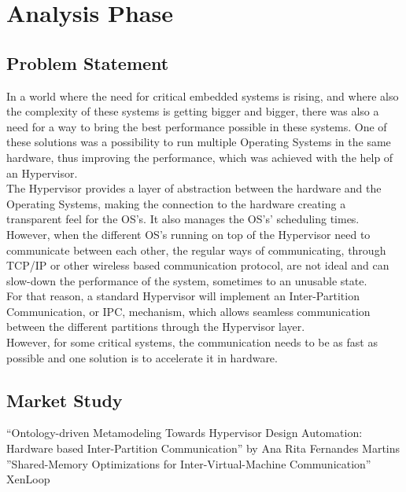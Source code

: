 \newpage
\section{Analysis Phase}

\subsection{Problem Statement}
In a world where the need for critical embedded systems is rising, and where also the complexity of these systems is getting bigger and bigger, there was also a need for a way to bring the best performance possible in these systems. One of these solutions was a possibility to run multiple Operating Systems in the same hardware, thus improving the performance, which was achieved with the help of an Hypervisor.\\
\indent The Hypervisor provides a layer of abstraction between the hardware and the Operating Systems, making the connection to the hardware creating a transparent feel for the OS’s. It also manages the OS’s’ scheduling times. However, when the different OS’s running on top of the Hypervisor need to communicate between each other, the regular ways of communicating, through TCP/IP or other wireless based communication protocol, are not ideal and can slow-down the performance of the system, sometimes to an unusable state.\\
\indent For that reason, a standard Hypervisor will implement an Inter-Partition Communication, or IPC, mechanism, which allows seamless communication between the different partitions through the Hypervisor layer.\\
\indent However, for some critical systems, the communication needs to be as fast as possible and one solution is to accelerate it in hardware.

\subsection{Market Study}

“Ontology-driven Metamodeling Towards Hypervisor Design Automation: Hardware based Inter-Partition Communication” by Ana Rita Fernandes Martins\\
\indent ”Shared-Memory Optimizations for Inter-Virtual-Machine Communication”\\
\indent XenLoop \cite{Nastide2010}\\

